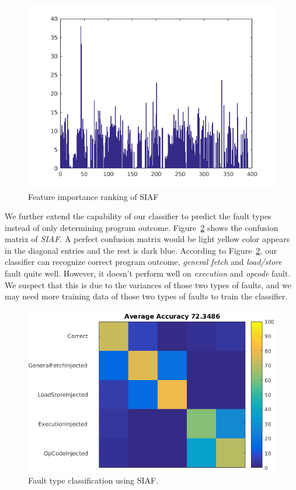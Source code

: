 \begin{figure}[ht]
\begin{center}
   \includegraphics[width=0.8\linewidth]{./figures/feat_same.png}
\end{center}
   \caption{Feature importance ranking of SIAF}
\label{fig:feat-same}
\end{figure}

We further extend the capability of our classifier to predict the fault types instead of only determining program outcome.
Figure~\ref{fig:siaf-multi} shows the confusion matrix of \emph{SIAF}. A perfect confusion matrix would be light yellow color appears in the diagonal entries and the rest is dark blue. According to Figure~\ref{fig:siaf-multi}, our classifier can recognize correct program outcome, \emph{general fetch} and \emph{load/store} fault quite well. However, it doesn't perform well on \emph{execution} and \emph{opcode} fault. We suspect that this is due to the variances of those two types of faults, and we may need more training data of those two types of faults to train the classifier.

\begin{figure}[ht]
\begin{center}
   \includegraphics[width=0.8\linewidth]{./figures/siaf_multi.png}
\end{center}
    \vspace{-0.4cm}
   \caption{Fault type classification using SIAF.}

\label{fig:siaf-multi}
\end{figure}

